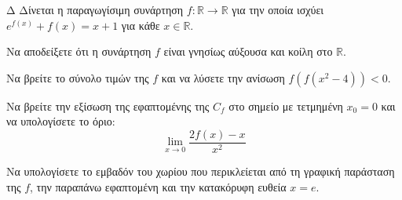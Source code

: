 \begin{thema}{Δ}
Δίνεται η παραγωγίσιμη συνάρτηση $f : \mathbb{R} \to \mathbb{R}$ για την οποία ισχύει $e^{f(x)} + f(x) = x + 1$ για κάθε $x \in \mathbb{R}$.
\begin{erwthma}
    \item Να αποδείξετε ότι η συνάρτηση $f$ είναι γνησίως αύξουσα και κοίλη στο $\mathbb{R}$.
    \item Να βρείτε το σύνολο τιμών της $f$ και να λύσετε την ανίσωση $\displaystyle f(f(x^2 - 4)) < 0$.
    \item Να βρείτε την εξίσωση της εφαπτομένης της $C_f$ στο σημείο με τετμημένη $x_0 = 0$ και να υπολογίσετε το όριο:
    \[ \lim_{x \to 0} \frac{2f(x) - x}{x^2} \]
    \item Να υπολογίσετε το εμβαδόν του χωρίου που περικλείεται από τη γραφική παράσταση της $f$, την παραπάνω εφαπτομένη και την κατακόρυφη ευθεία $x = e$.
\end{erwthma}
\end{thema}

